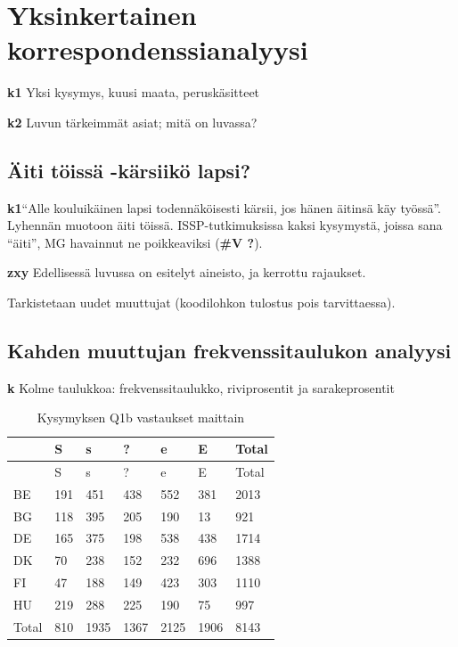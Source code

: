 \documentclass[
  finnish,
]{book}
\begin{document}
\hypertarget{yksinkertainen-korrespondenssianalyysi}{%
\chapter{Yksinkertainen
korrespondenssianalyysi}\label{yksinkertainen-korrespondenssianalyysi}}

\textbf{k1} Yksi kysymys, kuusi maata, peruskäsitteet

\textbf{k2} Luvun tärkeimmät asiat; mitä on luvassa?

\hypertarget{uxe4iti-tuxf6issuxe4--kuxe4rsiikuxf6-lapsi}{%
\section{Äiti töissä -kärsiikö
lapsi?}\label{uxe4iti-tuxf6issuxe4--kuxe4rsiikuxf6-lapsi}}

\textbf{k1}``Alle kouluikäinen lapsi todennäköisesti kärsii, jos hänen
äitinsä käy työssä''. Lyhennän muotoon äiti töissä. ISSP-tutkimuksissa
kaksi kysymystä, joissa sana ``äiti'', MG havainnut ne poikkeaviksi
(\textbf{\#V ?}).

\textbf{zxy} Edellisessä luvussa on esitelyt aineisto, ja kerrottu
rajaukset.

Tarkistetaan uudet muuttujat (koodilohkon tulostus pois tarvittaessa).

\hypertarget{kahden-muuttujan-frekvenssitaulukon-analyysi}{%
\section{Kahden muuttujan frekvenssitaulukon
analyysi}\label{kahden-muuttujan-frekvenssitaulukon-analyysi}}

\textbf{k} Kolme taulukkoa: frekvenssitaulukko, riviprosentit ja
sarakeprosentit

\begin{longtable}[]{@{}lllllll@{}}
\caption{Kysymyksen Q1b vastaukset maittain}\tabularnewline
\toprule
& S & s & ? & e & E & Total\tabularnewline
\midrule
\endfirsthead
\toprule
& S & s & ? & e & E & Total\tabularnewline
\midrule
\endhead
BE & 191 & 451 & 438 & 552 & 381 & 2013\tabularnewline
BG & 118 & 395 & 205 & 190 & 13 & 921\tabularnewline
DE & 165 & 375 & 198 & 538 & 438 & 1714\tabularnewline
DK & 70 & 238 & 152 & 232 & 696 & 1388\tabularnewline
FI & 47 & 188 & 149 & 423 & 303 & 1110\tabularnewline
HU & 219 & 288 & 225 & 190 & 75 & 997\tabularnewline
Total & 810 & 1935 & 1367 & 2125 & 1906 & 8143\tabularnewline
\bottomrule
\end{longtable}
\end{document}
